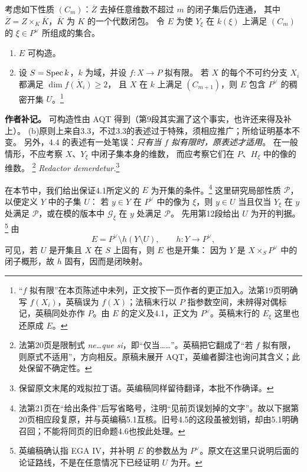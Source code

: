 \begingroup
\def\OO{\mathcal O}\def\FF{\mathcal F}\def\GG{\mathcal G}
\def\PP{\mathbf P}\def\calP{\mathcal P}\def\dd{\delta}
\def\Div{\operatorname{Div}}\def\depth{\operatorname{depth}}
\def\pr{\operatorname{pr}}\def\coker{\operatorname{coker}}
考虑如下性质 $(C_m)$：$\overline Z$ 去掉任意维数不超过 $m$ 的闭子集后仍连通，
其中 $\overline Z=Z\times_K\overline K$，$\overline K$ 为 $K$ 的一个代数闭包。
令 $E$ 为使 $Y_\xi$ 在 $k(\xi)$ 上满足 $(C_m)$ 的 $\xi\in P^\vee$ 所组成的集合。
\begin{enumerate}
\item[(a)] $E$ 可构造。
\item[(b)] 设 $S=\operatorname{Spec} k$，$k$ 为域，并设 $f:X\to P$ 拟有限。
  若 $X$ 的每个不可约分支 $X_i$ 都满足 $\dim\overline{f(X_i)}\geq2$，
  且 $X$ 在 $k$ 上满足 $(C_{m+1})$，则 $E$ 包含 $P^\vee$ 的稠密开集 $U$。\footnote{“$f$ 拟有限”在本页陈述中未列，正文按下一页作者的更正加入。法第19页明确写 $f(X_i)$，英稿误为 $f(X)$；法稿末行以 $P$ 指参数空间，未辨得对偶标记，英稿同处亦作 $P$。由 $E$ 的定义及4.1，正文为 $P^\vee$。英稿末行的 $E_\xi$ 这里也还原成 $E$。}
\end{enumerate}

\noindent\textbf{作者补记。}
可构造性由 AQT 得到（第9段其实漏了这个事实，也许还来得及补上）。
(b)原则上来自3.3，不过3.3的表述过于特殊，须相应推广；所给证明基本不变。
另外，4.4 的表述有一处笔误：\emph{只有当 $f$ 拟有限时，原表述才适用}。
在一般情形，不应考察 $X$、$Y_\xi$ 中闭子集本身的维数，
而应考察它们在 $P$、$H_\xi$ 中的像的维数。%
\footnote{法第20页是限制式 \emph{ne\ldots que si}，即“仅当……”。英稿把它翻成了“若 $f$ 拟有限，则原式不适用”，方向相反。原稿未展开 AQT，英编者脚注也询问其含义；此处保留不确定性。}
\textit{Redactor demerdetur.}\footnote{保留原文末尾的戏拟拉丁语。英编稿同样留待翻译，本批不作确译。}

在本节中，我们给出保证4.1所定义的 $E$ 为开集的条件。\footnote{法第21页在“给出条件”后写省略号，注明“见前页误划掉的文字”。故以下据第20页相应段复原，并与英编稿5.1互核。旧号4.5的这段虽被划销，却由5.1明确召回；不能将同页的旧命题4.6也按此处理。}
这里研究局部性质 $\mathcal P$，以便定义 $Y$ 中的子集 $U$：
若 $y\in Y$ 在 $P^\vee$ 中的像为 $\xi$，则 $y\in U$ 当且仅当
$Y_\xi$ 在 $y$ 处满足 $\mathcal P$，或在模的版本中 $\GG_\xi$ 在 $y$ 处满足 $\mathcal P$。
先用第12段给出 $U$ 为开的判据。\footnote{英编稿确认指 EGA IV，并补明 $E$ 的参数丛为 $P^\vee$。原文在这里只说明后面的论证路线，不是在任意情况下已经证明 $U$ 为开。}
由
\[
 E=P^\vee\setminus h(Y\setminus U),\qquad h:Y\longrightarrow P^\vee,
\]
可见，若 $U$ 是开集且 $X$ 在 $S$ 上固有，则 $E$ 也是开集：
因为 $Y$ 是 $X\times_S P^\vee$ 中的闭子概形，故 $h$ 固有，因而是闭映射。

